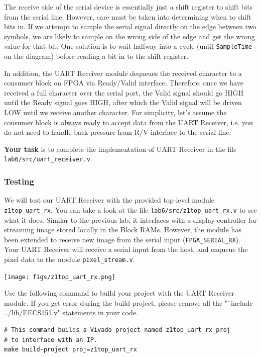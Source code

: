\documentclass[11pt]{article}
\begin{document}
The receive side of the serial device is essentially just a shift register to shift bits from the serial line.
However, care must be taken into determining when to shift bits in.
If we attempt to sample the serial signal directly on the edge between two symbols, we are likely to sample on the wrong side of the edge and get the wrong value for that bit.
One solution is to wait halfway into a cycle (until \verb|SampleTime| on the diagram) before reading a bit in to the shift register.

In addition, the UART Receiver module dequeues the received character to a consumer block on FPGA via Ready/Valid interface. Therefore, once we have received a full character over the serial port, the Valid signal should go HIGH until the Ready signal goes HIGH, after which the Valid signal will be driven LOW until we receive another character. For simplicity, let's assume the consumer block is always ready to accept data from the UART Receiver, i.e. you do not need to handle back-pressure from R/V interface to the serial line.

\textbf{Your task} is to complete the implementation of UART Receiver in the file \verb|lab6/src/uart_receiver.v|.

\subsubsection{Testing}

We will test our UART Receiver with the provided top-level module \verb|z1top_uart_rx|. You can take a look at the file \verb|lab6/src/z1top_uart_rx.v| to see what it does. Similar to the previous lab, it interfaces with a display controller for streaming image stored locally in the Block RAMs. However, the module has been extended to receive new image from the serial input (\verb|FPGA_SERIAL_RX|). Your UART Receiver will receive a serial input from the host, and enqueue the pixel data to the module \verb|pixel_stream.v|. 

\begin{center}
\texttt{[image: figs/z1top\_uart\_rx.png]}
\end{center}

Use the following command to build your project with the UART Receiver module. If you get error during the build project, please remove all the "`include ../lib/EECS151.v" statements in your code.

\begin{verbatim}
# This command builds a Vivado project named z1top_uart_rx_proj
# to interface with an IP.
make build-project proj=z1top_uart_rx
\end{verbatim}
\end{document}
